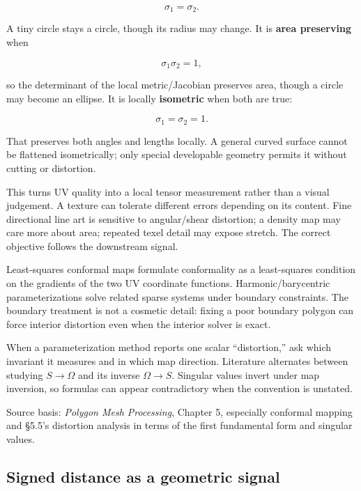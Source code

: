 \[
\sigma_1=\sigma_2.
\]

A tiny circle stays a circle, though its radius may change. It is \textbf{area preserving} when

\[
\sigma_1\sigma_2=1,
\]

so the determinant of the local metric/Jacobian preserves area, though a circle may become an ellipse. It is locally \textbf{isometric} when both are true:

\[
\sigma_1=\sigma_2=1.
\]

That preserves both angles and lengths locally. A general curved surface cannot be flattened isometrically; only special developable geometry permits it without cutting or distortion.

This turns UV quality into a local tensor measurement rather than a visual judgement. A texture can tolerate different errors depending on its content. Fine directional line art is sensitive to angular/shear distortion; a density map may care more about area; repeated texel detail may expose stretch. The correct objective follows the downstream signal.

Least-squares conformal maps formulate conformality as a least-squares condition on the gradients of the two UV coordinate functions. Harmonic/barycentric parameterizations solve related sparse systems under boundary constraints. The boundary treatment is not a cosmetic detail: fixing a poor boundary polygon can force interior distortion even when the interior solver is exact.

When a parameterization method reports one scalar ``distortion,'' ask which invariant it measures and in which map direction. Literature alternates between studying \(S\rightarrow\Omega\) and its inverse \(\Omega\rightarrow S\). Singular values invert under map inversion, so formulas can appear contradictory when the convention is unstated.

Source basis: \emph{Polygon Mesh Processing}, Chapter 5, especially conformal mapping and §5.5's distortion analysis in terms of the first fundamental form and singular values.

\subsection{Signed distance as a geometric signal}\label{03-visual-computing-i-ch002-signed-distance-as-a-geometric-signal}

